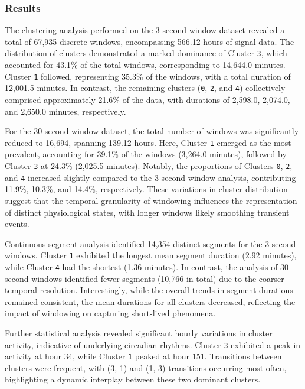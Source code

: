 \documentclass[a4paper,12pt,twoside]{article}
\begin{document}
\subsubsection{Results}

The clustering analysis performed on the 3-second window dataset revealed a total of 67,935 discrete windows, encompassing 566.12 hours of signal data. The distribution of clusters demonstrated a marked dominance of Cluster \texttt{3}, which accounted for 43.1\% of the total windows, corresponding to 14,644.0 minutes. Cluster \texttt{1} followed, representing 35.3\% of the windows, with a total duration of 12,001.5 minutes. In contrast, the remaining clusters (\texttt{0}, \texttt{2}, and \texttt{4}) collectively comprised approximately 21.6\% of the data, with durations of 2,598.0, 2,074.0, and 2,650.0 minutes, respectively. 

For the 30-second window dataset, the total number of windows was significantly reduced to 16,694, spanning 139.12 hours. Here, Cluster \texttt{1} emerged as the most prevalent, accounting for 39.1\% of the windows (3,264.0 minutes), followed by Cluster \texttt{3} at 24.3\% (2,025.5 minutes). Notably, the proportions of Clusters \texttt{0}, \texttt{2}, and \texttt{4} increased slightly compared to the 3-second window analysis, contributing 11.9\%, 10.3\%, and 14.4\%, respectively. These variations in cluster distribution suggest that the temporal granularity of windowing influences the representation of distinct physiological states, with longer windows likely smoothing transient events.

Continuous segment analysis identified 14,354 distinct segments for the 3-second windows. Cluster \texttt{1} exhibited the longest mean segment duration (2.92 minutes), while Cluster \texttt{4} had the shortest (1.36 minutes). In contrast, the analysis of 30-second windows identified fewer segments (10,766 in total) due to the coarser temporal resolution. Interestingly, while the overall trends in segment durations remained consistent, the mean durations for all clusters decreased, reflecting the impact of windowing on capturing short-lived phenomena. 

Further statistical analysis revealed significant hourly variations in cluster activity, indicative of underlying circadian rhythms. Cluster \texttt{3} exhibited a peak in activity at hour 34, while Cluster \texttt{1} peaked at hour 151. Transitions between clusters were frequent, with (3, 1) and (1, 3) transitions occurring most often, highlighting a dynamic interplay between these two dominant clusters.
\end{document}
